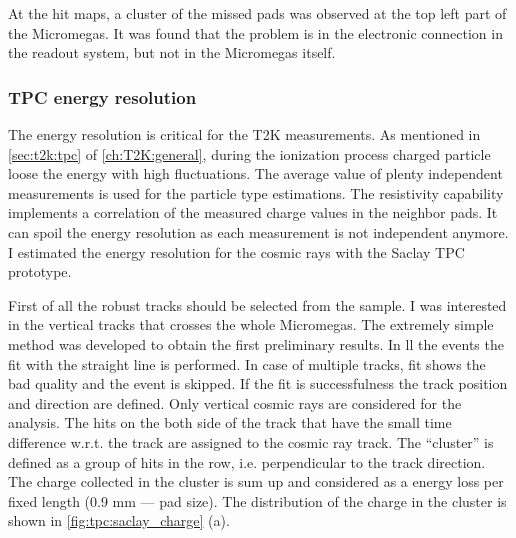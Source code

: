 \documentclass[../main.tex]{subfiles}
\begin{document}
At the hit maps, a cluster of the missed pads was observed at the top left part of the Micromegas. It was found that the problem is in the electronic connection in the readout system, but not in the Micromegas itself.

\subsubsection{TPC energy resolution}
\label{sec:tpc:tpc_dedx}
The energy resolution is critical for the T2K measurements. As mentioned in \autoref{sec:t2k:tpc} of \autoref{ch:T2K:general}, during the ionization process charged particle loose the energy with high fluctuations. The average value of plenty independent measurements is used for the particle type estimations. The resistivity capability implements a correlation of the measured charge values in the neighbor pads. It can spoil the energy resolution as each measurement is not independent anymore. I estimated the energy resolution for the cosmic rays with the Saclay TPC prototype.

First of all the robust tracks should be selected from the sample. I was interested in the vertical tracks that crosses the whole Micromegas. The extremely simple method was developed to obtain the first preliminary results. In ll the events the fit with the straight line is performed. In case of multiple tracks, fit shows the bad quality and the event is skipped. If the fit is successfulness the track position and direction are defined. Only vertical cosmic rays are considered for the analysis. The hits on the both side of the track that have the small time difference w.r.t. the track are assigned to the cosmic ray track. The ``cluster'' is defined as a group of hits in the row, i.e. perpendicular to the track direction. The charge collected in the cluster is sum up and considered as a energy loss per fixed length (0.9 mm --- pad size). The distribution of the charge in the cluster is shown in \autoref{fig:tpc:saclay_charge} (a).
\end{document}
